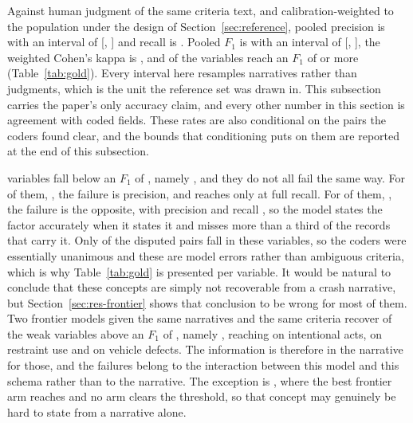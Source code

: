 Against human judgment of the same criteria text, and calibration-weighted to the population
under the design of Section~\ref{sec:reference}, pooled precision is \GoldPrecision{} with an
interval of [\GoldPrecisionLo{}, \GoldPrecisionHi{}] and recall is \GoldRecall{}. Pooled
$F_1$ is \GoldFone{} with an interval of [\GoldFoneLo{}, \GoldFoneHi{}], the weighted Cohen's
kappa is \GoldKappa{}, and \GoldNStrong{} of the \GoldNVars{} variables reach an $F_1$ of
\StrongFoneThreshold{} or more (Table~\ref{tab:gold}). Every interval here resamples narratives
rather than judgments, which is the unit the reference set was drawn in. This subsection carries
the paper's only accuracy claim, and every other number in this section is agreement with coded
fields. These rates are also conditional on the pairs the coders found clear, and the bounds
that conditioning puts on them are reported at the end of this subsection.

\GoldNWeak{} variables fall below an $F_1$ of \WeakFoneThreshold{}, namely \GoldWeakVars{}, and
they do not all fail the same way. For \GoldNWeakPrecision{} of them, \GoldWeakPrecisionVars{},
the failure is precision, and \GoldWorstPrecVar{} reaches only \GoldWorstPrec{} at full recall.
For \GoldNWeakRecall{} of them, \GoldWeakRecallVar{}, the failure is the opposite, with
precision \GoldWeakRecallPrec{} and recall \GoldWeakRecallValue{}, so the model states the
factor accurately when it states it and misses more than a third of the records that carry it.
Only \GoldWeakDisputes{} of the \GoldNDisputed{} disputed pairs fall in these variables, so the
coders were essentially unanimous and these are model errors rather than ambiguous criteria,
which is why Table~\ref{tab:gold} is presented per variable. It would be natural to conclude
that these concepts are simply not recoverable from a crash narrative, but
Section~\ref{sec:res-frontier} shows that conclusion to be wrong for most of them. Two frontier
models given the same narratives and the same criteria recover \FrontierNRecovered{} of the
\GoldNWeak{} weak variables above an $F_1$ of \FrontierWeakThreshold{}, namely
\FrontierRecoveredVars{}, reaching \BestIntentionalFone{} on intentional acts,
\BestUnbeltedFone{} on restraint use and \BestVehicleDefectFone{} on vehicle defects. The
information is therefore in the narrative for those, and the failures belong to the interaction
between this model and this schema rather than to the narrative. The exception is
\FrontierNotRecoveredVars{}, where the best frontier arm reaches \BestWrongWayFone{} and no arm
clears the threshold, so that concept may genuinely be hard to state from a narrative alone.

